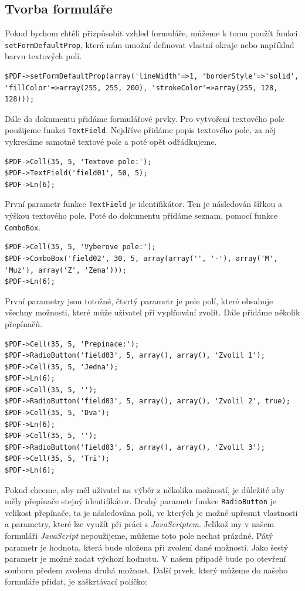 \documentclass[czech,BP]{thesiskiv}
\begin{document}
\subsection{Tvorba formuláře}
Pokud bychom chtěli přizpůsobit vzhled formuláře, můžeme k tomu použít funkci \texttt{setFormDefaultProp}, která nám umožní definovat vlastní okraje nebo například barvu textových polí. 
\begin{lstlisting}
$PDF->setFormDefaultProp(array('lineWidth'=>1, 'borderStyle'=>'solid', 'fillColor'=>array(255, 255, 200), 'strokeColor'=>array(255, 128, 128)));
\end{lstlisting}
Dále do dokumentu přidáme formulářové prvky. Pro vytvoření textového pole použijeme funkci \texttt{TextField}. Nejdříve přidáme popis textového pole, za něj vykreslíme samotné textové pole a poté opět odřádkujeme.
\begin{lstlisting}
$PDF->Cell(35, 5, 'Textove pole:');
$PDF->TextField('field01', 50, 5);
$PDF->Ln(6);
\end{lstlisting}
První parametr funkce \texttt{TextField} je identifikátor. Ten je následován šířkou a výškou textového pole. Poté do dokumentu přidáme seznam, pomocí funkce \texttt{ComboBox}.
\begin{lstlisting}
$PDF->Cell(35, 5, 'Vyberove pole:');
$PDF->ComboBox('field02', 30, 5, array(array('', '-'), array('M', 'Muz'), array('Z', 'Zena')));
$PDF->Ln(6);
\end{lstlisting}
První parametry jsou totožné, čtvrtý parametr je pole polí, které obsahuje všechny možnosti, které může uživatel při vyplňování zvolit. Dále přidáme několik přepínačů.
\begin{lstlisting}
$PDF->Cell(35, 5, 'Prepinace:');
$PDF->RadioButton('field03', 5, array(), array(), 'Zvolil 1');
$PDF->Cell(35, 5, 'Jedna');
$PDF->Ln(6);
$PDF->Cell(35, 5, '');
$PDF->RadioButton('field03', 5, array(), array(), 'Zvolil 2', true);
$PDF->Cell(35, 5, 'Dva');
$PDF->Ln(6);
$PDF->Cell(35, 5, '');
$PDF->RadioButton('field03', 5, array(), array(), 'Zvolil 3');
$PDF->Cell(35, 5, 'Tri');
$PDF->Ln(6);
\end{lstlisting}
Pokud chceme, aby měl uživatel na výběr z několika možností, je důležité aby měly přepínače stejný identifikátor. Druhý parametr funkce \texttt{RadioButton} je velikost přepínače, ta je následována poli, ve kterých je možné upřesnit vlastnosti a parametry, které lze využít při práci s \emph{JavaScriptem}. Jelikož my v našem formuláři \emph{JavaScript} nepoužijeme, můžeme toto pole nechat prázdné. Pátý parametr je hodnota, která bude uložena při zvolení dané možnosti. Jako šestý parametr je možné zadat výchozí hodnotu. V našem případě bude po otevření souboru předem zvolena druhá možnost. Další prvek, který můžeme do našeho formuláře přidat, je zaškrtávací políčko:
\end{document}
